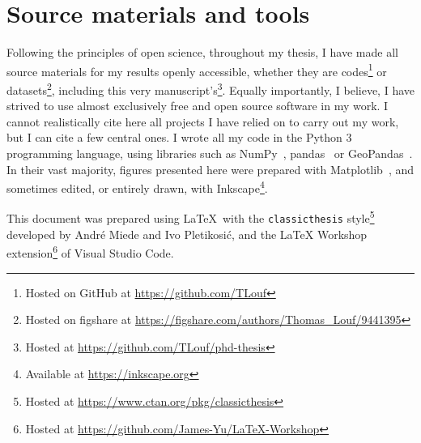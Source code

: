 \documentclass[../thesis.tex]{subfiles}
\begin{document}
\section{Source materials and tools}
Following the principles of open science, throughout my thesis, I have made all source
materials for my results openly accessible, whether they are codes\footnote{Hosted on
GitHub at \url{https://github.com/TLouf}} or datasets\footnote{Hosted on figshare at
\url{https://figshare.com/authors/Thomas_Louf/9441395}}, including this very
manuscript's\footnote{Hosted at \url{https://github.com/TLouf/phd-thesis}}. Equally importantly, I believe, I have strived to use almost exclusively free
and open source software in my work. I cannot realistically cite here all projects I
have relied on to carry out my work, but I can cite a few central ones. I wrote all my
code in the Python 3 programming language, using libraries such as
NumPy~\cite{HarrisArrayProgramming2020},
pandas~\cite{teamPandasdevPandas2020} or
GeoPandas~\cite{JordahlGeopandasGeopandas2020}. In their vast majority, figures
presented here were prepared with Matplotlib~\cite{HunterMatplotlib2D2007}, and
sometimes edited, or entirely drawn, with Inkscape\footnote{Available at
\url{https://inkscape.org}}.

This document was prepared using \LaTeX\ with the \texttt{classicthesis}
style\footnote{Hosted at \url{https://www.ctan.org/pkg/classicthesis}} developed by
Andr\'e Miede and Ivo Pletikosić, and the LaTeX Workshop extension\footnote{Hosted at
\url{https://github.com/James-Yu/LaTeX-Workshop}} of Visual Studio Code.
\end{document}
